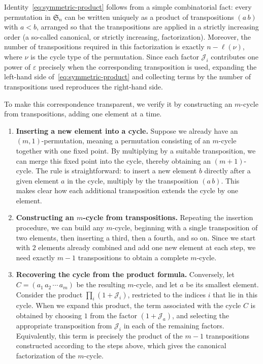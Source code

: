 \documentclass{article}
\theoremstyle{plain}
\theoremstyle{definition}
\numberwithin{equation}{section}
\begin{document}
Identity~\eqref{eq:symmetric-product} follows from a simple combinatorial fact: every permutation in $\mathfrak{S}_n$ can be written uniquely as a product of transpositions $(a\,b)$ with $a<b$, arranged so that the transpositions are applied in a strictly increasing order (a so-called canonical, or strictly increasing, factorization). Moreover, the number of transpositions required in this factorization is exactly $n-\ell(\nu)$, where $\nu$ is the cycle type of the permutation. Since each factor $\mathcal{J}_i$ contributes one power of $\varepsilon$ precisely when the corresponding transposition is used, expanding the left-hand side of~\eqref{eq:symmetric-product} and collecting terms by the number of transpositions used reproduces the right-hand side.

To make this correspondence transparent, we verify it by constructing an $m$-cycle from transpositions, adding one element at a time.

\begin{enumerate}
    \item \textbf{Inserting a new element into a cycle.}
    Suppose we already have an $(m,1)$-permutation, meaning a permutation consisting of an $m$-cycle together with one fixed point. By multiplying by a suitable transposition, we can merge this fixed point into the cycle, thereby obtaining an $(m+1)$-cycle. The rule is straightforward: to insert a new element $b$ directly after a given element $a$ in the cycle, multiply by the transposition $(a\,b)$. This makes clear how each additional transposition extends the cycle by one element.

    \item \textbf{Constructing an $m$-cycle from transpositions.}
    Repeating the insertion procedure, we can build any $m$-cycle, beginning with a single transposition of two elements, then inserting a third, then a fourth, and so on. Since we start with $2$ elements already combined and add one new element at each step, we need exactly $m-1$ transpositions to obtain a complete $m$-cycle.

    \item \textbf{Recovering the cycle from the product formula.}
    Conversely, let $C = (a_1\, a_2\, \cdots\, a_m)$ be the resulting $m$-cycle, and let $a$ be its smallest element. Consider the product $\prod_i (1+\mathcal{J}_i)$, restricted to the indices $i$ that lie in this cycle. When we expand this product, the term associated with the cycle $C$ is obtained by choosing $1$ from the factor $(1+\mathcal{J}_a)$, and selecting the appropriate transposition from $\mathcal{J}_i$ in each of the remaining factors. Equivalently, this term is precisely the product of the $m-1$ transpositions constructed according to the steps above, which gives the canonical factorization of the $m$-cycle.
\end{enumerate}
\end{document}
